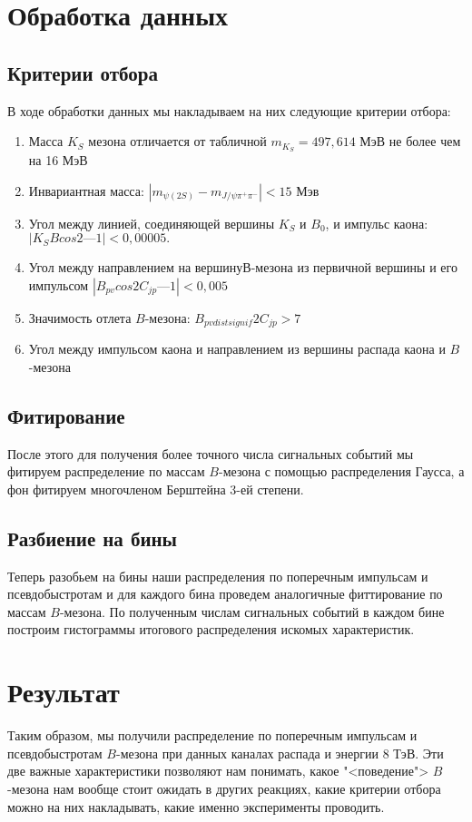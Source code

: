 \documentclass[12pt]{kiarticle}
\begin{document}
\section{Обработка данных}

\subsection{Критерии отбора}
	В ходе обработки данных мы накладываем на них следующие критерии отбора: 
	
	\begin{enumerate}
		\item Масса $ K_S $ мезона отличается от табличной $ m_{K_S} = 497,614 $ МэВ не более чем на 16 МэВ
		
		\item Инвариантная масса: $ |m_{\psi(2S)} - m_{J/\psi \pi^+\pi^-} | < 15 $ Мэв
		
		\item  Угол между линией, соединяющей вершины $ K_S $ и $ B_0 $, и импульс каона: $ |K_SBcos2 — 1| < 0,00005. $
		
		\item Угол между направлением на вершину$  В $-мезона из первичной вершины и его импульсом $ |B_{pv}cos2C_{jp} — 1| < 0,005 $
		
		\item Значимость отлета $ B $-мезона: $ B_{pvdistsignif}2C_{jp} > 7  $
		
		\item Угол между импульсом каона и направлением из вершины распада каона и $ B$-мезона
	\end{enumerate}

\subsection{Фитирование}

После этого для получения более точного числа сигнальных событий мы фитируем распределение по массам $ B $-мезона с помощью распределения Гаусса, а фон фитируем многочленом Берштейна 3-ей степени. 

\subsection{Разбиение на бины}

Теперь разобьем на бины наши распределения по поперечным импульсам и псевдобыстротам и для каждого бина проведем аналогичные фиттирование по массам $ B $-мезона. По полученным числам сигнальных событий в каждом бине построим гистограммы итогового распределения искомых характеристик.

\section{Результат}
	
Таким образом, мы получили распределение по поперечным импульсам и псевдобыстротам $ B $-мезона при данных каналах распада и энергии $ 8 $ ТэВ. Эти две важные характеристики позволяют нам понимать, какое "<поведение"> $ B $-мезона нам вообще стоит ожидать в других реакциях, какие критерии отбора можно на них накладывать, какие именно эксперименты проводить.
	
	
	
\end{document}
